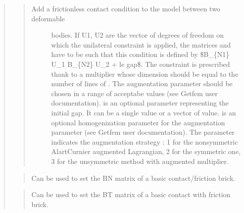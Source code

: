 \documentclass[a4paper,11pt,english]{sphinxmanual}
\begin{document}
\begin{quote}
\sphinxAtStartPar
{}
\begin{quote}
\begin{description}
\item[{Add a frictionless contact condition to the model between two deformable}] \leavevmode
\sphinxAtStartPar
bodies. If U1, U2 are the vector
of degrees of freedom on which the unilateral constraint is applied,
the matrices  and  have to be such that this condition
is defined by
\$B\_\{N1\} U\_1 B\_\{N2\} U\_2 + le gap\$. The constraint is prescribed thank
to a multiplier
 whose dimension should be equal to the number of lines of
. The augmentation parameter  should be chosen in a range of
acceptabe values (see Getfem user documentation).  is an
optional parameter representing the initial gap. It can be a single value
or a vector of value.  is an optional homogenization
parameter for the augmentation parameter
(see Getfem user documentation). The parameter  indicates
the augmentation strategy : 1 for the non\sphinxhyphen{}symmetric Alart\sphinxhyphen{}Curnier
augmented Lagrangian, 2 for the symmetric one, 3 for the unsymmetric
method with augmented multiplier.

\end{description}
\end{quote}

\sphinxAtStartPar
{}
\begin{quote}

\sphinxAtStartPar
Can be used to set the BN matrix of a basic contact/friction brick.
\end{quote}

\sphinxAtStartPar
{}
\begin{quote}

\sphinxAtStartPar
Can be used to set the BT matrix of a basic contact with
friction brick.
\end{quote}


\end{quote}
\end{document}
